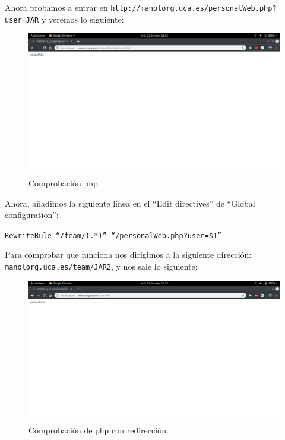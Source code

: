 \documentclass[12pt,letterpaper]{article}
\begin{document}
\begin{itemize}
	Ahora probamos a entrar en \texttt{http://manolorg.uca.es/personalWeb.php?user=JAR} y veremos lo siguiente:
	\newpage
	\begin{figure}[h]
		\centering
		\includegraphics[scale=0.34]{JAR.png}
		\caption{Comprobación php.}
		\label{Comprobación php}
	\end{figure}

	Ahora, añadimos la siguiente línea en el ``Edit directives'' de ``Global configuration'':
	\begin{center}
		\texttt{RewriteRule ``\^/team/(.*)'' ``/personalWeb.php?user=\$1''}
	\end{center}
	
	Para comprobar que funciona nos dirigimos a la siguiente dirección:\\ \texttt{manolorg.uca.es/team/JAR2}, y nos sale lo siguiente:
	\newpage
	\begin{figure}[h]
		\centering
		\includegraphics[scale=0.34]{JAR2.png}
		\caption{Comprobación de php con redirección.}
		\label{PHP2}
	\end{figure}
\end{itemize}
\end{document}
